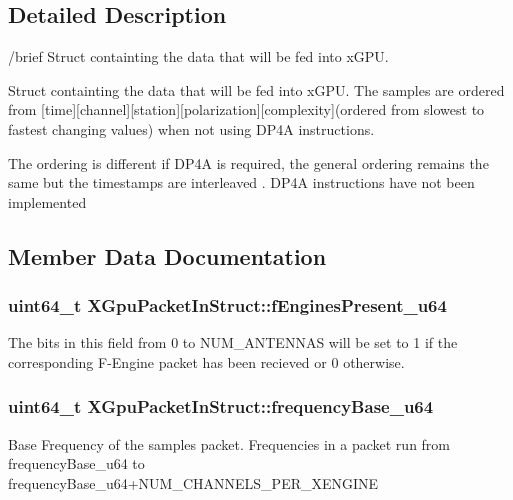 \subsection{Detailed Description}
/brief Struct containting the data that will be fed into x\+G\+PU.

Struct containting the data that will be fed into x\+G\+PU. The samples are ordered from \mbox{[}time\mbox{]}\mbox{[}channel\mbox{]}\mbox{[}station\mbox{]}\mbox{[}polarization\mbox{]}\mbox{[}complexity\mbox{]}(ordered from slowest to fastest changing values) when not using D\+P4A instructions.

The ordering is different if D\+P4A is required, the general ordering remains the same but the timestamps are interleaved . D\+P4A instructions have not been implemented 

\subsection{Member Data Documentation}
\subsubsection[{\texorpdfstring{f\+Engines\+Present\+\_\+u64}{fEnginesPresent_u64}}]{\setlength{\rightskip}{0pt plus 5cm}uint64\+\_\+t X\+Gpu\+Packet\+In\+Struct\+::f\+Engines\+Present\+\_\+u64}\hypertarget{struct_x_gpu_packet_in_struct_aea83ca75c7038265b61ad0da0c7363b8}{}\label{struct_x_gpu_packet_in_struct_aea83ca75c7038265b61ad0da0c7363b8}
The bits in this field from 0 to N\+U\+M\+\_\+\+A\+N\+T\+E\+N\+N\+AS will be set to 1 if the corresponding F-\/\+Engine packet has been recieved or 0 otherwise. 
\subsubsection[{\texorpdfstring{frequency\+Base\+\_\+u64}{frequencyBase_u64}}]{\setlength{\rightskip}{0pt plus 5cm}uint64\+\_\+t X\+Gpu\+Packet\+In\+Struct\+::frequency\+Base\+\_\+u64}\hypertarget{struct_x_gpu_packet_in_struct_a24ec55c89338104cadc92d84e8c39076}{}\label{struct_x_gpu_packet_in_struct_a24ec55c89338104cadc92d84e8c39076}
Base Frequency of the samples packet. Frequencies in a packet run from frequency\+Base\+\_\+u64 to frequency\+Base\+\_\+u64+\+N\+U\+M\+\_\+\+C\+H\+A\+N\+N\+E\+L\+S\+\_\+\+P\+E\+R\+\_\+\+X\+E\+N\+G\+I\+NE 
